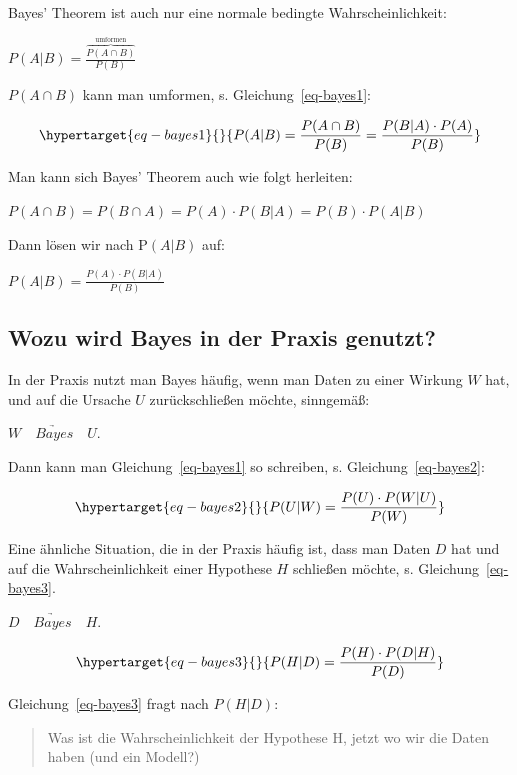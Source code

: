 \documentclass[
  a4paper,
  DIV=11]{scrreprt}
\theoremstyle{definition}
\theoremstyle{remark}
\begin{document}
Bayes' Theorem ist auch nur eine normale bedingte Wahrscheinlichkeit:

\(P(A|B) = \frac{\overbrace{ P(A\cap B)}^\text{umformen}}{P(B)}\)

\(P(A\cap B)\) kann man umformen, s. Gleichung~\ref{eq-bayes1}:

\begin{equation}\protect\hypertarget{eq-bayes1}{}{P(A|B) =\frac{P(A\cap B)}{P(B)} = \frac{P(B|A) \cdot P(A)}{P(B)}}\label{eq-bayes1}\end{equation}

Man kann sich Bayes' Theorem auch wie folgt herleiten:

\(P(A\cap B) = P(B \cap A) = P(A) \cdot P(B|A) = P(B) \cdot P(A|B)\)

Dann lösen wir nach P\((A|B)\) auf:

\(P(A|B) = \frac{P(A) \cdot P(B|A)}{P(B)}\)

\hypertarget{wozu-wird-bayes-in-der-praxis-genutzt}{%
\subsection{Wozu wird Bayes in der Praxis
genutzt?}\label{wozu-wird-bayes-in-der-praxis-genutzt}}

In der Praxis nutzt man Bayes häufig, wenn man Daten zu einer Wirkung
\(W\) hat, und auf die Ursache \(U\) zurückschließen möchte, sinngemäß:

\(W \quad \underrightarrow{Bayes} \quad U\).

Dann kann man Gleichung~\ref{eq-bayes1} so schreiben, s.
Gleichung~\ref{eq-bayes2}:

\begin{equation}\protect\hypertarget{eq-bayes2}{}{P(U|W) = \frac{ P(U) \cdot P(W|U) }{P(W)}}\label{eq-bayes2}\end{equation}

Eine ähnliche Situation, die in der Praxis häufig ist, dass man Daten
\(D\) hat und auf die Wahrscheinlichkeit einer Hypothese \(H\) schließen
möchte, s. Gleichung~\ref{eq-bayes3}.

\(D \quad \underrightarrow{Bayes} \quad H\).

\begin{equation}\protect\hypertarget{eq-bayes3}{}{P(H|D) = \frac{ P(H) \cdot P(D|H) }{P(D)}}\label{eq-bayes3}\end{equation}

Gleichung~\ref{eq-bayes3} fragt nach \(P(H|D)\):

\begin{quote}
Was ist die Wahrscheinlichkeit der Hypothese H, jetzt wo wir die Daten
haben (und ein Modell?)
\end{quote}
\end{document}
